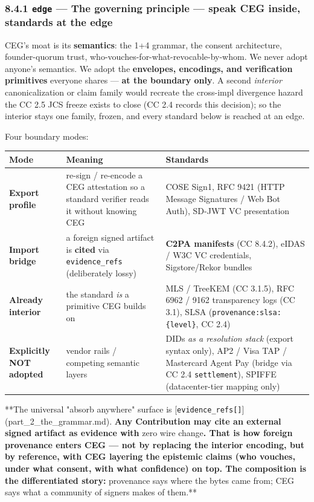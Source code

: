 \documentclass[11pt]{article}
\begin{document}
\subsubsection*{8.4.1 \texttt{edge} — The governing principle — speak CEG inside, standards at the edge}


CEG's moat is its \textbf{semantics}: the 1+4 grammar, the consent architecture, founder-quorum trust, who-vouches-for-what-revocable-by-whom. We never adopt anyone's semantics. We adopt the \textbf{envelopes, encodings, and verification primitives} everyone shares — \textbf{at the boundary only}. A second \textit{interior} canonicalization or claim family would recreate the cross-impl divergence hazard the CC 2.5 JCS freeze exists to close (CC 2.4 records this decision); so the interior stays one family, frozen, and every standard below is reached at an edge.


Four boundary modes:


{\footnotesize
\begin{longtable}{|p{5.33cm}|p{5.33cm}|p{5.33cm}|}\hline
\textbf{Mode} & \textbf{Meaning} & \textbf{Standards} \\ \hline\endhead
\textbf{Export profile} & re-sign / re-encode a CEG attestation so a standard verifier reads it without knowing CEG & COSE Sign1, RFC 9421 (HTTP Message Signatures / Web Bot Auth), SD-JWT VC presentation \\ \hline
\textbf{Import bridge} & a foreign signed artifact is \textbf{cited} via \texttt{evidence\_refs} (deliberately lossy) & \textbf{C2PA manifests} (CC 8.4.2), eIDAS / W3C VC credentials, Sigstore/Rekor bundles \\ \hline
\textbf{Already interior} & the standard \textit{is} a primitive CEG builds on & MLS / TreeKEM (CC 3.1.5), RFC 6962 / 9162 transparency logs (CC 3.1), SLSA (\texttt{provenance:slsa:\{level\}}, CC 2.4) \\ \hline
\textbf{Explicitly NOT adopted} & vendor rails / competing semantic layers & DIDs \textit{as a resolution stack} (export syntax only), AP2 / Visa TAP / Mastercard Agent Pay (bridge via CC 2.4 \texttt{settlement}), SPIFFE (datacenter-tier mapping only) \\ \hline
\end{longtable}}


**The universal "absorb anywhere" surface is [\texttt{evidence\_refs[]}](part\_2\_the\_grammar.md).\textbf{ Any Contribution may cite an external signed artifact as evidence with }zero wire change\textbf{. That is how foreign provenance enters CEG — not by replacing the interior encoding, but by reference, with CEG layering the epistemic claims (who vouches, under what consent, with what confidence) on top. The composition is the differentiated story: }provenance says where the bytes came from; CEG says what a community of signers makes of them.**
\end{document}
